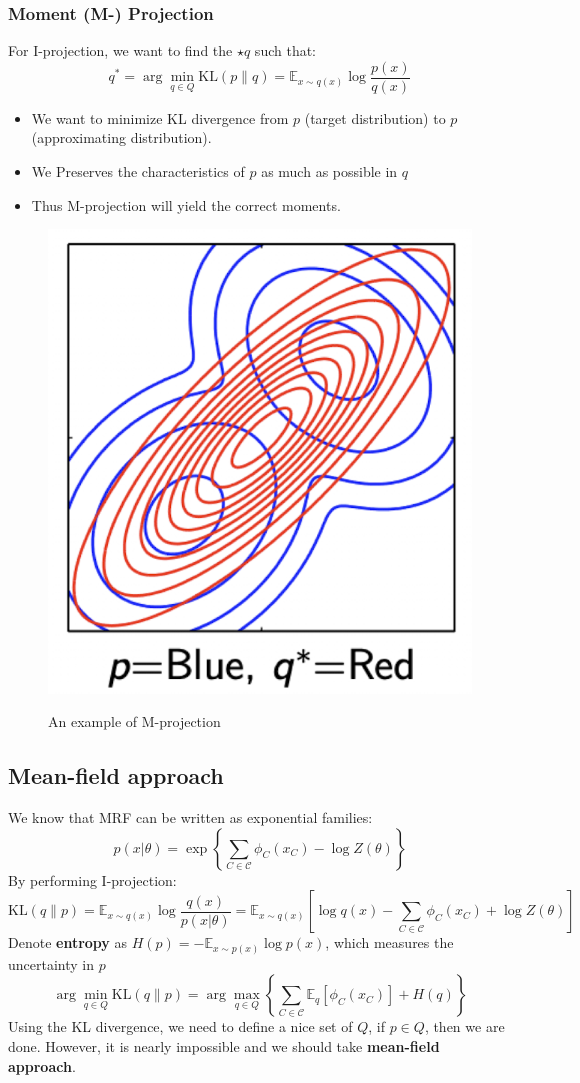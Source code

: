 \subsubsection*{Moment (M-) Projection}
For I-projection, we want to find the $\star{q}$ such that:
$$q^*=\arg \min _{q \in Q} \mathrm{KL}(p \| q)=\mathbb{E}_{x \sim q(x)} \log \frac{p(x)}{q(x)}$$
\begin{itemize}
    \item We want to minimize KL divergence from $p$ (target distribution) to $p$ (approximating distribution).
    \item We Preserves the characteristics of $p$ as much as possible in $q$
    \item Thus M-projection will yield the correct moments.
\end{itemize}
\begin{figure}[H]
    \centering
    \caption{An example of M-projection}
    \includegraphics[width = .3\linewidth]{codes/figures/section8/figure_8_5.png}
    \label{fig:M-projection}
\end{figure}

\subsection{Mean-field approach}
We know that MRF can be written as exponential families:
$$
p(x | \theta)=\exp \left\{\sum_{C \in \mathcal{C}} \phi_C\left(x_C\right)-\log Z(\theta)\right\}
$$
By performing I-projection:
$$\mathrm{KL}(q \| p)=\mathbb{E}_{x \sim q(x)} \log \frac{q(x)}{p(x | \theta)}=\mathbb{E}_{x \sim q(x)}\left[\log q(x)-\sum_{C \in \mathcal{C}} \phi_C\left(x_C\right)+\log Z(\theta)\right]$$
Denote \textbf{entropy} as $H(p)=-\mathbb{E}_{x \sim p(x)} \log p(x)$, which measures the uncertainty in $p$
$$\arg \min _{q \in Q} \mathrm{KL}(q \| p)=\arg \max _{q \in Q}\left\{\sum_{C \in \mathcal{C}} \mathbb{E}_q\left[\phi_C\left(x_C\right)\right]+H(q)\right\}$$
Using the KL divergence, we need to define a nice set of $Q$, if $p\in Q$, then we are done. However, it is nearly impossible and we should take \textbf{mean-field approach}.\\

